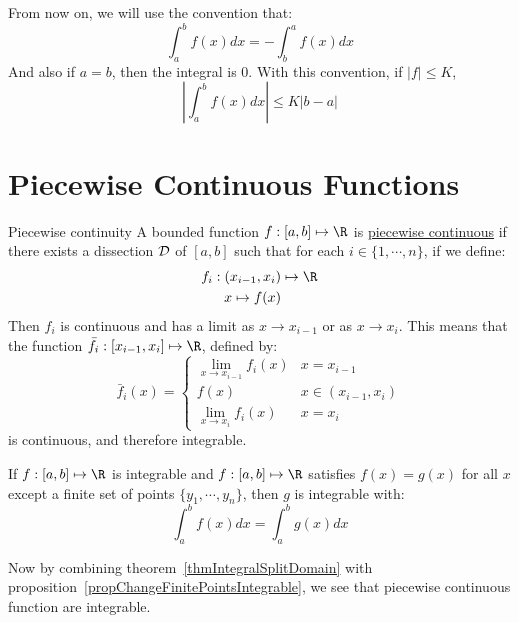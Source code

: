 \documentclass[../Main.tex]{subfiles}
\begin{document}
From now on, we will use the convention that:
\begin{equation*}
    \int_a^b f(x) dx = -\int_b^a f(x) dx
\end{equation*}
And also if $a = b$, then the integral is 0. With this convention, if $|f| \leq K$,
\begin{equation*}
    \left|\int_a^b f(x) dx\right| \leq K|b - a|
\end{equation*}
\section{Piecewise Continuous Functions}
\begin{definition}{Piecewise continuity}
    A bounded function $f : [a, b] \mapsto \R$ is \underline{piecewise continuous} if there exists a dissection $\mathcal{D}$ of $[a, b]$ such that for each $i \in \{1, \cdots, n\}$, if we define:
    \begin{align*}
        f_i : (x_{i - 1}, x_i) &\mapsto \R \\
        x \mapsto f(x)
    \end{align*}
    Then $f_i$ is continuous and has a limit as $x \to x_{i - 1}$ or as $x \to x_i$. This means that the function $\bar{f}_i : [x_{i-1}, x_i] \mapsto \R$, defined by:
    \begin{equation*}
        \bar{f}_i(x) =
        \begin{cases}
            \lim_{x \to x_{i - 1}} f_i(x) & x = x_{i - 1} \\
            f(x) & x \in (x_{i - 1}, x_i) \\
            \lim_{x \to x_i} f_i(x) & x = x_i
        \end{cases}
    \end{equation*}
    is continuous, and therefore integrable.
\end{definition}
\begin{proposition}
    If $f : [a, b] \mapsto \R$ is integrable and $f : [a, b] \mapsto \R$ satisfies $f(x) = g(x)$ for all $x$ except a finite set of points $\{y_1, \cdots, y_n\}$, then $g$ is integrable with:
    \begin{equation*}
        \int_a^b f(x) dx = \int_a^b g(x) dx
    \end{equation*}
    \label{propChangeFinitePointsIntegrable}
\end{proposition}
Now by combining theorem~\ref{thmIntegralSplitDomain} with proposition~\ref{propChangeFinitePointsIntegrable}, we see that piecewise continuous function are integrable.
\end{document}
